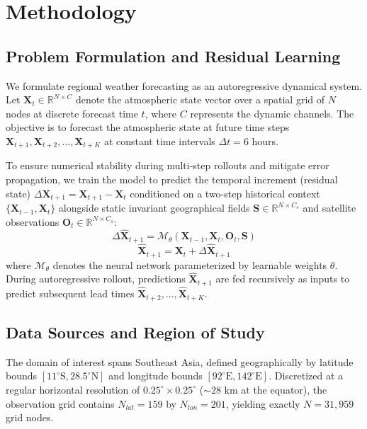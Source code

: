 \section{Methodology}
\label{sec:method}

\subsection{Problem Formulation and Residual Learning}
We formulate regional weather forecasting as an autoregressive dynamical system. Let $\mathbf{X}_t \in \mathbb{R}^{N \times C}$ denote the atmospheric state vector over a spatial grid of $N$ nodes at discrete forecast time $t$, where $C$ represents the dynamic channels. The objective is to forecast the atmospheric state at future time steps $\mathbf{X}_{t+1}, \mathbf{X}_{t+2}, \dots, \mathbf{X}_{t+K}$ at constant time intervals $\Delta t = 6$ hours.

To ensure numerical stability during multi-step rollouts and mitigate error propagation, we train the model to predict the temporal increment (residual state) $\Delta \mathbf{X}_{t+1} = \mathbf{X}_{t+1} - \mathbf{X}_t$ conditioned on a two-step historical context $\{\mathbf{X}_{t-1}, \mathbf{X}_t\}$ alongside static invariant geographical fields $\mathbf{S} \in \mathbb{R}^{N \times C_s}$ and satellite observations $\mathbf{O}_t \in \mathbb{R}^{N \times C_o}$:
\begin{equation}
\Delta \hat{\mathbf{X}}_{t+1} = \mathcal{M}_\theta\left(\mathbf{X}_{t-1}, \mathbf{X}_t, \mathbf{O}_t, \mathbf{S}\right)
\end{equation}
\begin{equation}
\hat{\mathbf{X}}_{t+1} = \mathbf{X}_t + \Delta \hat{\mathbf{X}}_{t+1}
\end{equation}
where $\mathcal{M}_\theta$ denotes the neural network parameterized by learnable weights $\theta$. During autoregressive rollout, predictions $\hat{\mathbf{X}}_{t+1}$ are fed recursively as inputs to predict subsequent lead times $\hat{\mathbf{X}}_{t+2}, \dots, \hat{\mathbf{X}}_{t+K}$.

\subsection{Data Sources and Region of Study}
The domain of interest spans Southeast Asia, defined geographically by latitude bounds $[11^\circ\text{S}, 28.5^\circ\text{N}]$ and longitude bounds $[92^\circ\text{E}, 142^\circ\text{E}]$. Discretized at a regular horizontal resolution of $0.25^\circ \times 0.25^\circ$ ($\sim 28\text{ km}$ at the equator), the observation grid contains $N_{lat} = 159$ by $N_{lon} = 201$, yielding exactly $N = 31,959$ grid nodes.

